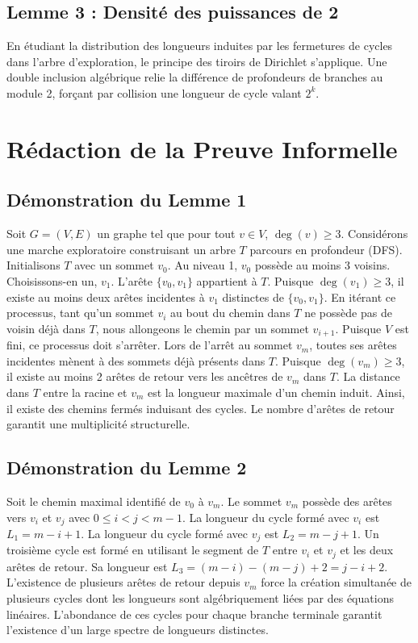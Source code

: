 \documentclass[11pt,a4paper]{article}
\begin{document}
\subsection{Lemme 3 : Densité des puissances de 2}
En étudiant la distribution des longueurs induites par les fermetures de cycles dans l'arbre d'exploration, le principe des tiroirs de Dirichlet s'applique. Une double inclusion algébrique relie la différence de profondeurs de branches au module 2, forçant par collision une longueur de cycle valant $2^k$.

\section{Rédaction de la Preuve Informelle}

\subsection{Démonstration du Lemme 1}
Soit $G = (V,E)$ un graphe tel que pour tout $v \in V$, $\deg(v) \geq 3$.
Considérons une marche exploratoire construisant un arbre $T$ parcours en profondeur (DFS).
Initialisons $T$ avec un sommet $v_0$.
Au niveau 1, $v_0$ possède au moins 3 voisins. Choisissons-en un, $v_1$. L'arête $\{v_0, v_1\}$ appartient à $T$.
Puisque $\deg(v_1) \geq 3$, il existe au moins deux arêtes incidentes à $v_1$ distinctes de $\{v_0, v_1\}$.
En itérant ce processus, tant qu'un sommet $v_i$ au bout du chemin dans $T$ ne possède pas de voisin déjà dans $T$, nous allongeons le chemin par un sommet $v_{i+1}$.
Puisque $V$ est fini, ce processus doit s'arrêter. Lors de l'arrêt au sommet $v_m$, toutes ses arêtes incidentes mènent à des sommets déjà présents dans $T$.
Puisque $\deg(v_m) \geq 3$, il existe au moins 2 arêtes de retour vers les ancêtres de $v_m$ dans $T$.
La distance dans $T$ entre la racine et $v_m$ est la longueur maximale d'un chemin induit. Ainsi, il existe des chemins fermés induisant des cycles. Le nombre d'arêtes de retour garantit une multiplicité structurelle.

\subsection{Démonstration du Lemme 2}
Soit le chemin maximal identifié de $v_0$ à $v_m$.
Le sommet $v_m$ possède des arêtes vers $v_i$ et $v_j$ avec $0 \leq i < j < m-1$.
La longueur du cycle formé avec $v_i$ est $L_1 = m - i + 1$.
La longueur du cycle formé avec $v_j$ est $L_2 = m - j + 1$.
Un troisième cycle est formé en utilisant le segment de $T$ entre $v_i$ et $v_j$ et les deux arêtes de retour. Sa longueur est $L_3 = (m - i) - (m - j) + 2 = j - i + 2$.
L'existence de plusieurs arêtes de retour depuis $v_m$ force la création simultanée de plusieurs cycles dont les longueurs sont algébriquement liées par des équations linéaires. L'abondance de ces cycles pour chaque branche terminale garantit l'existence d'un large spectre de longueurs distinctes.
\end{document}
